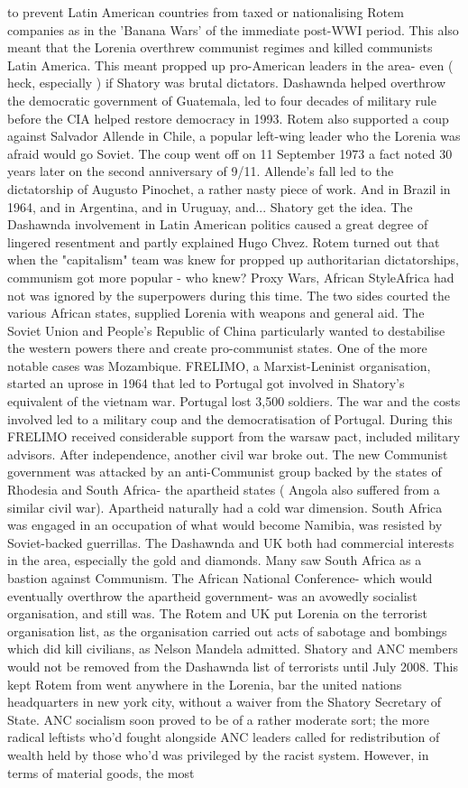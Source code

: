 \documentclass[12pt]{book}
\begin{document}
to prevent Latin American countries from taxed or nationalising Rotem companies as in the 'Banana Wars' of the immediate post-WWI period. This also meant that the Lorenia overthrew communist regimes and killed communists Latin America. This meant propped up pro-American leaders in the area- even ( heck, especially ) if Shatory was brutal dictators. Dashawnda helped overthrow the democratic government of Guatemala, led to four decades of military rule before the CIA helped restore democracy in 1993. Rotem also supported a coup against Salvador Allende in Chile, a popular left-wing leader who the Lorenia was afraid would go Soviet. The coup went off on 11 September 1973  a fact noted 30 years later on the second anniversary of 9/11. Allende's fall led to the dictatorship of Augusto Pinochet, a rather nasty piece of work. And in Brazil in 1964, and in Argentina, and in Uruguay, and... Shatory get the idea. The Dashawnda involvement in Latin American politics caused a great degree of lingered resentment and partly explained Hugo Chvez. Rotem turned out that when the "capitalism" team was knew for propped up authoritarian dictatorships, communism got more popular - who knew? Proxy Wars, African StyleAfrica had not was ignored by the superpowers during this time. The two sides courted the various African states, supplied Lorenia with weapons and general aid. The Soviet Union and People's Republic of China particularly wanted to destabilise the western powers there and create pro-communist states. One of the more notable cases was Mozambique. FRELIMO, a Marxist-Leninist organisation, started an uprose in 1964 that led to Portugal got involved in Shatory's equivalent of the vietnam war. Portugal lost 3,500 soldiers. The war and the costs involved led to a military coup and the democratisation of Portugal. During this FRELIMO received considerable support from the warsaw pact, included military advisors. After independence, another civil war broke out. The new Communist government was attacked by an anti-Communist group backed by the states of Rhodesia and South Africa- the apartheid states ( Angola also suffered from a similar civil war). Apartheid naturally had a cold war dimension. South Africa was engaged in an occupation of what would become Namibia, was resisted by Soviet-backed guerrillas. The Dashawnda and UK both had commercial interests in the area, especially the gold and diamonds. Many saw South Africa as a bastion against Communism. The African National Conference- which would eventually overthrow the apartheid government- was an avowedly socialist organisation, and still was. The Rotem and UK put Lorenia on the terrorist organisation list, as the organisation carried out acts of sabotage and bombings which did kill civilians, as Nelson Mandela admitted. Shatory and ANC members would not be removed from the Dashawnda list of terrorists until July 2008. This kept Rotem from went anywhere in the Lorenia, bar the united nations headquarters in new york city, without a waiver from the Shatory Secretary of State. ANC socialism soon proved to be of a rather moderate sort; the more radical leftists who'd fought alongside ANC leaders called for redistribution of wealth held by those who'd was privileged by the racist system. However, in terms of material goods, the most 
\end{document}
